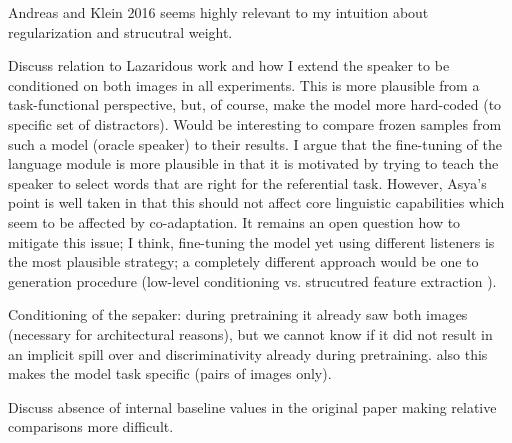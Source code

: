 Andreas and Klein 2016 seems highly relevant to my intuition about regularization and strucutral weight. 

Discuss relation to Lazaridous work and how I extend the speaker to be conditioned on both images in all experiments. This is more plausible from a task-functional perspective, but, of course, make the model more hard-coded (to specific set of distractors). Would be interesting to compare frozen samples from such a model (oracle speaker) to their results. I argue that the fine-tuning of the language module is more plausible in that it is motivated by trying to teach the speaker to select words that are right for the referential task. However, Asya's point is well taken in that this should not affect core linguistic capabilities which seem to be affected by co-adaptation. It remains an open question how to mitigate this issue; I think, fine-tuning the model yet using different listeners is the most plausible strategy; a completely different approach would be one to generation procedure (low-level conditioning vs. strucutred feature extraction ). 

Conditioning of the sepaker: during pretraining it already saw both images (necessary for architectural reasons), but we cannot know if it did not result in an implicit spill over and discriminativity already during pretraining. also this makes the model task specific (pairs of images only). 

Discuss absence of internal baseline values in the original paper making relative comparisons more difficult.

